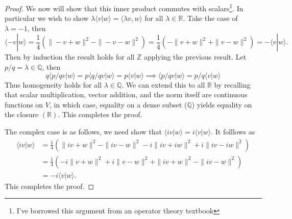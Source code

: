 \documentclass[11pt]{amsart}
\theoremstyle{definition}
\numberwithin{theorem}{section}
\numberwithin{definition}{section}
\numberwithin{equation}{section}
\begin{document}
{{{\begin{proof}
	We now will show that this inner product commutes with scalars\footnote{I've borrowed this argument from an operator theory textbook}. In particular we wish to show
	$\lambda \langle v| w\rangle = \langle \lambda v, w\rangle$ for all $\lambda \in \mathbb{R}.$  Take the case of $\lambda = -1$, then 
	\begin{equation*}
		\langle -v | w \rangle = \frac{1}{4}\left(\|-v + w\|^2 - \|- v -w\|^2\right) = \frac{1}{4}\left(-\|v + w\|^2 + \|v -w\|^2\right) = - \langle v| w \rangle.
	\end{equation*}
	Then by induction the result holds for all $\mathbb{Z}$ applying the previous result. Let $p/q=\lambda \in \mathbb{Q}$, then
	\begin{equation*}
		q \langle p/q v| w\rangle = p \langle q/q v| w\rangle =  p \langle v| w\rangle \implies  \langle p/q v| w\rangle = p/q \langle v| w\rangle
	\end{equation*}
	Thus homogeneity holds for all $\lambda \in \mathbb{Q}.$ We can extend this to all $\mathbb{R}$ by recalling that scalar multiplication, vector addition, and the norm itself are continuous functions on $V$, in which case, equality on a dense subset ($\mathbb{Q}$)  yields equality on the closure $(\mathbb{R})$. This completes the proof.

	The complex case is as follows, we need show that $ \langle iv |w \rangle  = i \langle v |w \rangle.$ It folllows as
	\begin{equation*}
	\begin{aligned}
	\langle iv |w \rangle &=  \frac{1}{4}\left(\|iv + w\|^2 - \|iv-w\|^2 - i\|iv + iw\|^2 + i \|iv - iw\|^2\right) \\
	&=  \frac{1}{4}\left(- i\|v + w\|^2 + i \|v - w\|^2 + \|iv + w\|^2 - \|iv-w\|^2 \right) \\
	&= -i \langle v| w \rangle.
	\end{aligned}
	\end{equation*}
	This completes the proof.
	\end{proof}

\medskip {}}}}
\end{document}
